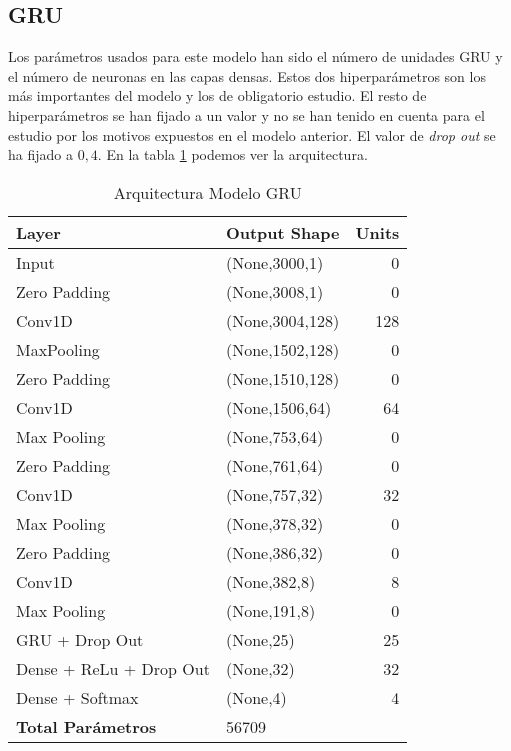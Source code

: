    \subsection{GRU}
    
        Los parámetros usados para este modelo han sido el número de unidades GRU y el número de neuronas en las capas densas. Estos dos hiperparámetros son los más importantes del modelo y los de obligatorio estudio. El resto de hiperparámetros se han fijado a un valor y no se han tenido en cuenta para el estudio por los motivos expuestos en el modelo anterior. El valor de \textit{drop out} se ha fijado a $0,4$. En la tabla \ref{table:arquitectura modelo gru} podemos ver la arquitectura. \\
        
    
        
            \begin{table}[htpb]
            \caption{Arquitectura Modelo GRU}
            \begin{center}
            \begin{tabular}{|l|l|r|}
            \hline
            \textbf{Layer} & \textbf{Output Shape} & \multicolumn{1}{l|}{\textbf{Units}} \\ \hline
            Input & (None,3000,1) & 0 \\ \hline
            Zero Padding & (None,3008,1) & 0 \\ \hline
            Conv1D & (None,3004,128) & 128 \\ \hline
            MaxPooling & (None,1502,128) & 0 \\ \hline
            Zero Padding & (None,1510,128) & 0 \\ \hline
            Conv1D & (None,1506,64) & 64 \\ \hline
            Max Pooling & (None,753,64) & 0 \\ \hline
            Zero Padding & (None,761,64) & 0 \\ \hline
            Conv1D & (None,757,32) & 32 \\ \hline
            Max Pooling & (None,378,32) & 0 \\ \hline
            Zero Padding & (None,386,32) & 0 \\ \hline
            Conv1D & (None,382,8) & 8 \\ \hline
            Max Pooling & (None,191,8) & 0 \\ \hline
            GRU + Drop Out & (None,25) & 25 \\ \hline
            Dense + ReLu + Drop Out & (None,32) & 32 \\ \hline
            Dense + Softmax & (None,4) & 4 \\ \hline
            \textbf{Total Parámetros} & 56709 & \\ \hline
            \end{tabular}
            \end{center}
            \label{table:arquitectura modelo gru}
            \end{table}



